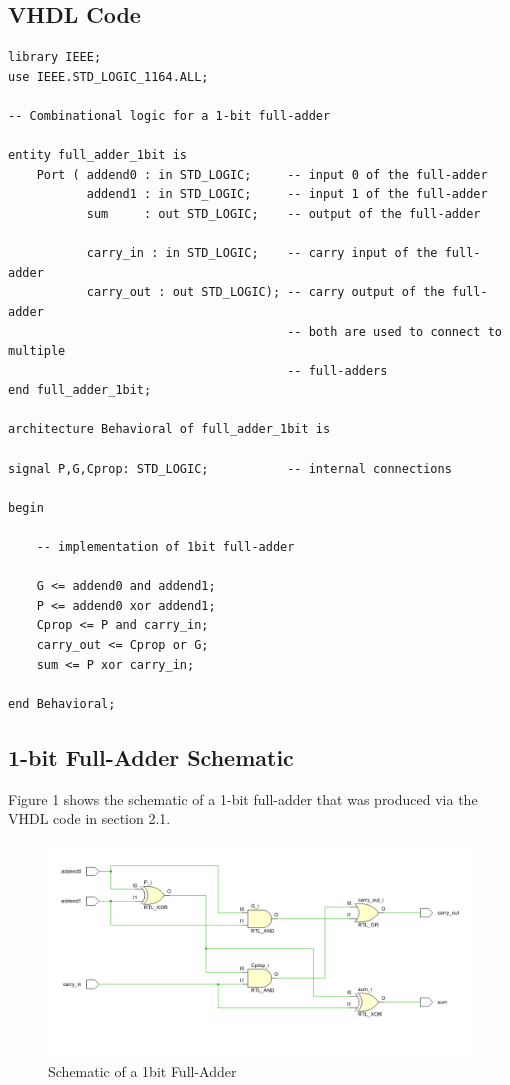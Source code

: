 \documentclass[11pt]{article}
\begin{document}
\subsection{VHDL Code}
\begin{verbatim}
library IEEE;
use IEEE.STD_LOGIC_1164.ALL;

-- Combinational logic for a 1-bit full-adder

entity full_adder_1bit is
    Port ( addend0 : in STD_LOGIC;     -- input 0 of the full-adder
           addend1 : in STD_LOGIC;     -- input 1 of the full-adder
           sum     : out STD_LOGIC;    -- output of the full-adder
           
           carry_in : in STD_LOGIC;    -- carry input of the full-adder
           carry_out : out STD_LOGIC); -- carry output of the full-adder
                                       -- both are used to connect to multiple
                                       -- full-adders
end full_adder_1bit;

architecture Behavioral of full_adder_1bit is

signal P,G,Cprop: STD_LOGIC;           -- internal connections

begin
    
    -- implementation of 1bit full-adder
    
    G <= addend0 and addend1; 
    P <= addend0 xor addend1;
    Cprop <= P and carry_in;
    carry_out <= Cprop or G;
    sum <= P xor carry_in;

end Behavioral;
\end{verbatim}
\newpage

\subsection {1-bit Full-Adder Schematic}

Figure 1 shows the schematic of a 1-bit full-adder that was produced via the VHDL code in section 2.1.


\begin{figure}[ht]
    \centering
    \includegraphics[width=1.0 \textwidth]{schematic_diagram.png}
    \caption{Schematic of a 1bit Full-Adder}
    \label{fig:isa}
\end{figure}
\end{document}
